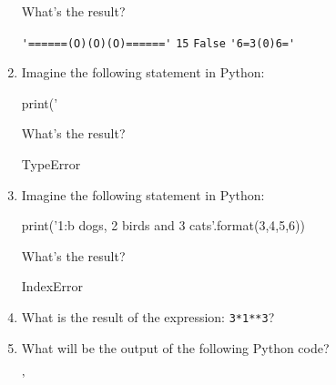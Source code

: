 \begin{enumerate}
What's the result?


\begin{choices}
    \choice \verb|'======(O)(O)(O)======'| %
    \choice \verb|15|
    \choice \verb|False|
    \choice \verb|'6=3(0)6='|
\end{choices}

\item Imagine the following statement in Python:

\begin{python}
print('%
\end{python}

What's the result?

\begin{choices}
    \choice TypeError %
    \choice {}
    \choice {}
    \choice {}
\end{choices}

\item Imagine the following statement in Python:

\begin{python}
print('{1:b} dogs, {2} birds and {3} cats'.format(3,4,5,6))
\end{python}

What's the result?


\begin{choices}
     \choice   {} %
    \choice {}
    \choice {}
    \choice IndexError
\end{choices}

\item What is the result of the expression: \verb|3*1**3|?

\begin{choices}
\end{choices}


\item What will be the output of the following Python code?

\begin{python}
'%
\end{python}

\begin{choices}
    \choice {} %
    \choice {}
    \choice {}
    \choice {}
\end{choices}



\end{enumerate}